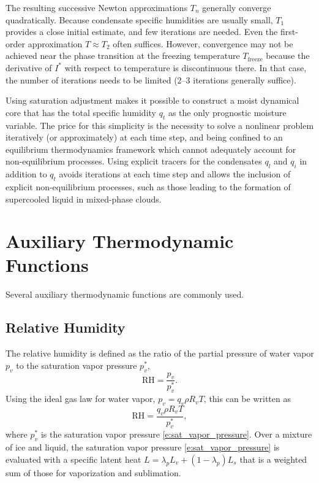 \documentclass{report}
\begin{document}
The resulting successive Newton approximations $T_n$ generally converge quadratically. Because condensate specific humidities are usually small, $T_1$ provides a close initial estimate, and few iterations are needed. Even the first-order approximation $T\approx T_2$ often suffices. However, convergence may not be achieved near the phase transition at the freezing temperature $T_{\mathrm{freeze}}$ because the derivative of $I^*$ with respect to temperature is discontinuous there. In that case, the number of iterations needs to be limited (2--3 iterations generally suffice). 

Using saturation adjustment makes it possible to construct a moist dynamical core that has the total specific humidity $q_t$ as the only prognostic moisture variable. The price for this simplicity is the necessity to solve a nonlinear problem iteratively (or approximately) at each time step, and being confined to an equilibrium thermodynamics framework which cannot adequately account for non-equilibrium processes. Using explicit tracers for the condensates $q_l$ and $q_i$ in addition to $q_t$ avoids iterations at each time step and allows the inclusion of explicit non-equilibrium processes, such as those leading to the formation of supercooled liquid in mixed-phase clouds. 

\section{Auxiliary Thermodynamic Functions}\label{s:aux_thermo}

Several auxiliary thermodynamic functions are commonly used. 

\subsection{Relative Humidity} 

The relative humidity is defined as the ratio of the partial pressure of water vapor $p_v$ to the saturation vapor pressure $p_v^*$,
\[
\mathrm{RH} = \frac{p_v}{p_v^*}.
\]
Using the ideal gas law for water vapor, $p_v = q_v \rho R_v T$, this can be written as
\begin{equation}
    \mathrm{RH} = \frac{q_v \rho R_v T}{p_v^*},
\end{equation}
where $p_v^*$ is the saturation vapor pressure \eqref{e:sat_vapor_pressure}. Over a mixture of ice and liquid, the saturation vapor pressure \eqref{e:sat_vapor_pressure} is evaluated with a specific latent heat $L = \lambda_p L_v + (1-\lambda_p) L_s$ that is a weighted sum of those for vaporization and sublimation.
\end{document}
